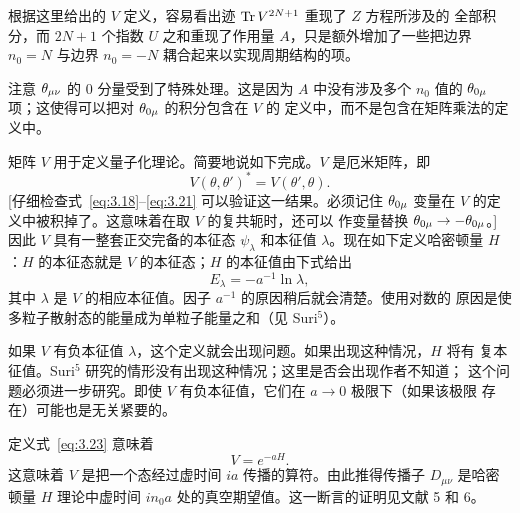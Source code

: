 根据这里给出的 $V$ 定义，容易看出迹 $\operatorname{Tr} V^{2N+1}$ 重现了 $Z$ 方程所涉及的
全部积分，而 $2N+1$ 个指数 $U$ 之和重现了作用量 $A$，只是额外增加了一些把边界
$n_{0}=N$ 与边界 $n_{0}=-N$ 耦合起来以实现周期结构的项。

注意 $\theta_{\mu\nu}$ 的 0 分量受到了特殊处理。这是因为 $A$ 中没有涉及多个
$n_{0}$ 值的 $\theta_{0\mu}$ 项；这使得可以把对 $\theta_{0\mu}$ 的积分包含在 $V$ 的
定义中，而不是包含在矩阵乘法的定义中。

矩阵 $V$ 用于定义量子化理论。简要地说如下完成。$V$ 是厄米矩阵，即
\begin{equation}
V(\theta,\theta')^{*} = V(\theta',\theta).
\label{eq:3.22}
\end{equation}
[仔细检查式~\eqref{eq:3.18}--\eqref{eq:3.21} 可以验证这一结果。必须记住
$\theta_{0\mu}$ 变量在 $V$ 的定义中被积掉了。这意味着在取 $V$ 的复共轭时，还可以
作变量替换 $\theta_{0\mu} \to -\theta_{0\mu}$。] 因此 $V$ 具有一整套正交完备的本征态
$\psi_{\lambda}$ 和本征值 $\lambda$。现在如下定义哈密顿量 $H$：$H$ 的本征态就是
$V$ 的本征态；$H$ 的本征值由下式给出
\begin{equation}
E_{\lambda} = -a^{-1}\ln\lambda,
\label{eq:3.23}
\end{equation}
其中 $\lambda$ 是 $V$ 的相应本征值。因子 $a^{-1}$ 的原因稍后就会清楚。使用对数的
原因是使多粒子散射态的能量成为单粒子能量之和（见 Suri${}^{5}$）。

如果 $V$ 有负本征值 $\lambda$，这个定义就会出现问题。如果出现这种情况，$H$ 将有
复本征值。Suri${}^{5}$ 研究的情形没有出现这种情况；这里是否会出现作者不知道；
这个问题必须进一步研究。即使 $V$ 有负本征值，它们在 $a\to0$ 极限下（如果该极限
存在）可能也是无关紧要的。

定义式~\eqref{eq:3.23} 意味着
\begin{equation}
V = e^{-aH}.
\label{eq:3.24}
\end{equation}
这意味着 $V$ 是把一个态经过虚时间 $ia$ 传播的算符。由此推得传播子 $D_{\mu\nu}$
是哈密顿量 $H$ 理论中虚时间 $in_{0}a$ 处的真空期望值。这一断言的证明见文献
5 和 6。

